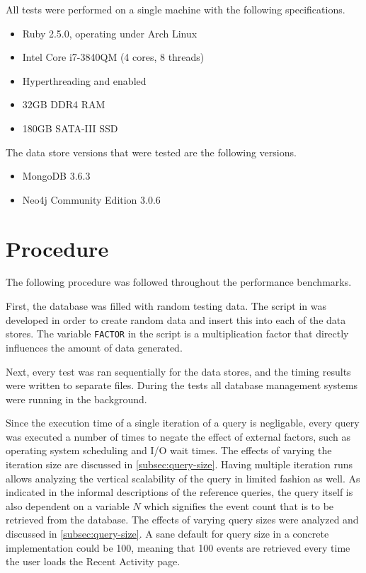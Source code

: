 All tests were performed on a single machine with the following specifications.

\begin{itemize}
  \item Ruby 2.5.0, operating under Arch Linux
  \item Intel Core i7-3840QM (4 cores, 8 threads)
  \item Hyperthreading and  enabled
  \item 32GB DDR4 RAM
  \item 180GB SATA-III SSD
\end{itemize}

The data store versions that were tested are the following versions.

\begin{itemize}
  \item MongoDB 3.6.3
  \item Neo4j Community Edition 3.0.6
\end{itemize}

\section{Procedure}
\label{sec:procedure}

The following procedure was followed throughout the performance benchmarks.

First, the database was filled with random testing data.
The script in  was developed in order to create random data and insert this into each of the data stores.
The variable \texttt{FACTOR} in the script is a multiplication factor that directly influences the amount of data generated.

Next, every test was ran sequentially for the data stores, and the timing results were written to separate files.
During the tests all database management systems were running in the background.

Since the execution time of a single iteration of a query is negligable, every query was executed a number of times to negate the effect of external factors, such as operating system scheduling and I/O wait times.
The effects of varying the iteration size are discussed in \cref{subsec:query-size}.
Having multiple iteration runs allows analyzing the vertical scalability of the query in limited fashion as well.
As indicated in the informal descriptions of the reference queries, the query itself is also dependent on a variable $N$ which signifies the event count that is to be retrieved from the database.
The effects of varying query sizes were analyzed and discussed in \cref{subsec:query-size}.
A sane default for query size in a concrete implementation could be 100, meaning that 100 events are retrieved every time the user loads the Recent Activity page.

